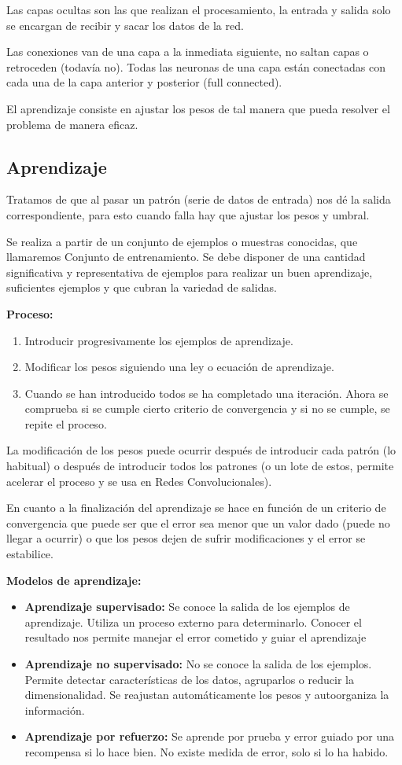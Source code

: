 \documentclass[12pt, twoside, openright]{report} %
\begin{document}
Las capas ocultas son las que realizan el procesamiento, la entrada y salida solo se encargan de recibir y sacar los datos de la red.

Las conexiones van de una capa a la inmediata siguiente, no saltan capas o retroceden (todavía no). Todas las neuronas de una capa están conectadas con cada una de la capa anterior y posterior (full connected).

El aprendizaje consiste en ajustar los pesos de tal manera que pueda resolver el problema de manera eficaz.

\subsection{Aprendizaje}
Tratamos de que al pasar un patrón (serie de datos de entrada) nos dé la salida correspondiente, para esto cuando falla hay que ajustar los pesos y umbral.

Se realiza a partir de un conjunto de ejemplos o muestras conocidas, que llamaremos Conjunto de entrenamiento. Se debe disponer de una cantidad significativa y representativa de ejemplos para realizar un buen aprendizaje, suficientes ejemplos y que cubran la variedad de salidas.

\textbf{Proceso:}
\begin{enumerate}
	\item Introducir progresivamente los ejemplos de aprendizaje.
	\item Modificar los pesos siguiendo una ley o ecuación de aprendizaje.
	\item Cuando se han introducido todos se ha completado una iteración. Ahora se comprueba si se cumple cierto criterio de convergencia y si no se cumple, se repite el proceso.
\end{enumerate}
\pagebreak

La modificación de los pesos puede ocurrir después de introducir cada patrón (lo habitual) o después de introducir todos los patrones (o un lote de estos, permite acelerar el proceso y se usa en Redes Convolucionales).

En cuanto a la finalización del aprendizaje se hace en función de un criterio de convergencia que puede ser que el error sea menor que un valor dado (puede no llegar a ocurrir) o que los pesos dejen de sufrir modificaciones y el error se estabilice.

\textbf{Modelos de aprendizaje:}
\begin{itemize}
	\item \textbf{Aprendizaje supervisado:} Se conoce la salida de los ejemplos de aprendizaje. Utiliza un proceso externo para determinarlo. Conocer el resultado nos permite manejar el error cometido y guiar el aprendizaje
	\item \textbf{Aprendizaje no supervisado:} No se conoce la salida de los ejemplos. Permite detectar características de los datos, agruparlos o reducir la dimensionalidad. Se reajustan automáticamente los pesos y autoorganiza la información.
	\item \textbf{Aprendizaje por refuerzo:} Se aprende por prueba y error guiado por una recompensa si lo hace bien. No existe medida de error, solo si lo ha habido.
\end{itemize}
\end{document}
